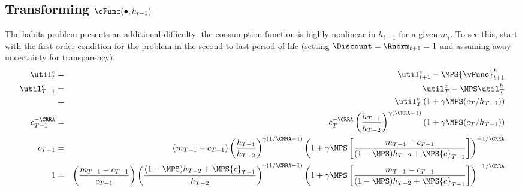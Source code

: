 \documentclass[titlepage]{\econtex}
\begin{document}
{\hypertarget{Transforming-cFunc}{}
\subsection{Transforming $\cFunc(\bullet,h_{t-1})$}

The habits problem presents an additional difficulty: the consumption
function is highly nonlinear in $h_{t-1}$ for a given ${m}_{t}$.   To
see this, start with the first order condition for the problem in the
second-to-last period of life (setting $\Discount = \Rnorm_{t+1} = 1$ and assuming
away uncertainty for transparency):
\begin{eqnarray}
        \util_{t}^{c}   & = & \util_{t+1}^{c} - \MPS {\vFunc}_{t+1}^{h}
\\      \util_{T-1}^{c} & = & \util_{T}^{c} - \MPS \util_{T}^{h}
\\  & = &  \util_{T}^{c}\left(1 + \gamma \MPS
({c}_{T}/h_{T-1})\right)
\\      {c}_{T-1}^{-\CRRA} & = &
        {c}_{T}^{-\CRRA}\left(\frac{h_{T-1}}{h_{T-2}}\right)^{\gamma(\CRRA-1)}\left(1 + \gamma \MPS
        ({c}_{T}/h_{T-1})\right)  \\
        {c}_{T-1} & = &
        ({m}_{T-1}-{c}_{T-1})\left(\frac{h_{T-1}}{h_{T-2}}\right)^{\gamma(1/\CRRA-1)}\left(1 +
        \gamma \MPS \left[\frac{{m}_{T-1}-{c}_{T-1}}{(1-\MPS)h_{T-2}+\MPS
        {c}_{T-1}}\right]\right)^{-1/\CRRA}
\\      1 & = &
        \left(\frac{{m}_{T-1}-{c}_{T-1}}{{c}_{T-1}}\right)\left(\frac{(1-\MPS)h_{T-2}+\MPS {c}_{T-1}}{h_{T-2}}\right)^{\gamma(1/\CRRA-1)}\left(1 +
        \gamma \MPS \left[\frac{{m}_{T-1}-{c}_{T-1}}{(1-\MPS)h_{T-2}+\MPS
        {c}_{T-1}}\right]\right)^{-1/\CRRA} \nonumber
\\ \label{eq:oneeq}
\end{eqnarray}

}
\end{document}
